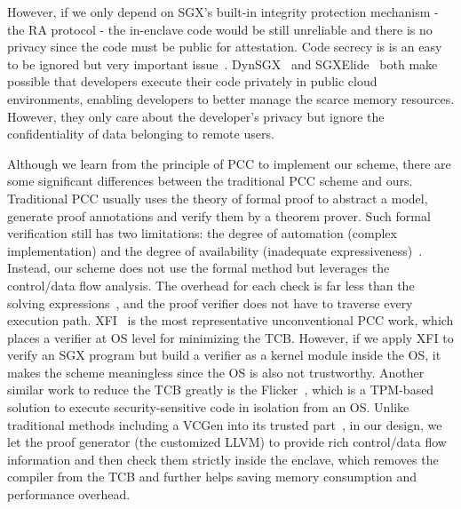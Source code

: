{However, if we only depend on SGX's built-in integrity protection mechanism - the RA protocol - the in-enclave code would be still unreliable and there is no privacy since the code must be public for attestation.
Code secrecy is is an easy to be ignored but very important issue~\cite{mazmudar2019mitigator,kuccuk2019managing}.
DynSGX~\cite{silva2017dynsgx} and SGXElide~\cite{bauman2018sgxelide} both make possible that developers execute their code privately in public cloud environments, enabling developers to better manage the scarce memory resources. However, they only care about the developer's privacy but ignore the confidentiality of data belonging to remote users. 
 



Although we learn from the principle of PCC to implement our scheme, there are some significant differences between the traditional PCC scheme and ours. Traditional PCC usually uses the theory of formal proof to abstract a model, generate proof annotations and verify them by a theorem prover. Such formal verification still has two limitations: the degree of automation (complex implementation) and the degree of availability (inadequate expressiveness)~\cite{d2008survey}. Instead, our scheme does not use the formal method but leverages the control/data flow analysis. The overhead for each check is far less than the solving expressions~\cite{de2008z3}, and the proof verifier does not have to traverse every execution path. XFI~\cite{erlingsson2006xfi} is the most representative unconventional PCC work, which places a verifier at OS level for minimizing the TCB. 
However, if we apply XFI to verify an SGX program but build a verifier as a kernel module inside the OS, it makes the scheme meaningless since the OS is also not trustworthy. 
Another similar work to reduce the TCB greatly is the Flicker~\cite{mccune2008flicker}, which is a TPM-based solution to execute security-sensitive code in isolation from an OS.
Unlike traditional methods including a VCGen into its trusted part~\cite{necula1997proof}, in our design, we let the proof generator (the customized LLVM) to provide rich control/data flow information and then check them strictly inside the enclave, which removes the compiler from the TCB and further helps saving memory consumption and performance overhead.

}